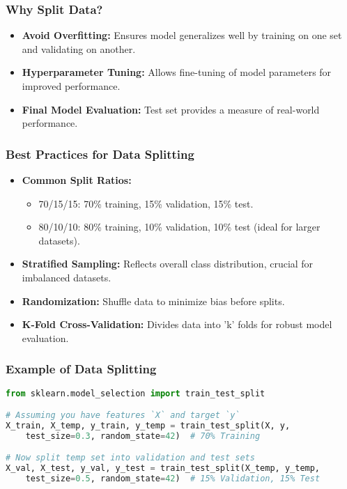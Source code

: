 \documentclass[aspectratio=169]{beamer}
\begin{document}
\begin{frame}[fragile]
    \frametitle{Why Split Data?}
    \begin{itemize}
        \item \textbf{Avoid Overfitting:} Ensures model generalizes well by training on one set and validating on another.
        \item \textbf{Hyperparameter Tuning:} Allows fine-tuning of model parameters for improved performance.
        \item \textbf{Final Model Evaluation:} Test set provides a measure of real-world performance.
    \end{itemize}
\end{frame}

\begin{frame}[fragile]
    \frametitle{Best Practices for Data Splitting}
    \begin{itemize}
        \item \textbf{Common Split Ratios:}
        \begin{itemize}
            \item 70/15/15: 70\% training, 15\% validation, 15\% test.
            \item 80/10/10: 80\% training, 10\% validation, 10\% test (ideal for larger datasets).
        \end{itemize}
        \item \textbf{Stratified Sampling:} Reflects overall class distribution, crucial for imbalanced datasets.
        \item \textbf{Randomization:} Shuffle data to minimize bias before splits.
        \item \textbf{K-Fold Cross-Validation:} Divides data into 'k' folds for robust model evaluation.
    \end{itemize}
\end{frame}

\begin{frame}[fragile]
    \frametitle{Example of Data Splitting}
    \begin{lstlisting}[language=Python]
from sklearn.model_selection import train_test_split

# Assuming you have features `X` and target `y`
X_train, X_temp, y_train, y_temp = train_test_split(X, y, 
    test_size=0.3, random_state=42)  # 70% Training

# Now split temp set into validation and test sets
X_val, X_test, y_val, y_test = train_test_split(X_temp, y_temp, 
    test_size=0.5, random_state=42)  # 15% Validation, 15% Test
    \end{lstlisting}
\end{frame}
\end{document}
